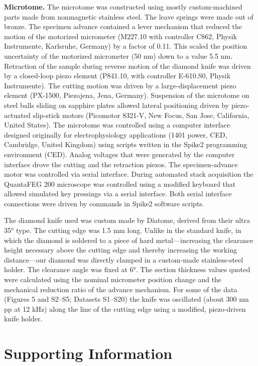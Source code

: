 \documentclass{article}
\begin{document}
\textbf{Microtome.} The microtome was constructed using mostly custom-machined parts made from nonmagnetic stainless steel. The leave springs were made out of bronze. The specimen advance contained a lever mechanism that reduced the motion of the motorized micrometer (M227.10 with controller C862, Physik Instrumente, Karlsruhe, Germany) by a factor of 0.11. This scaled the position uncertainty of the motorized micrometer (50 nm) down to a value 5.5 nm. Retraction of the sample during reverse motion of the diamond knife was driven by a closed-loop piezo element (P841.10, with controller E-610.S0, Physik Instrumente). The cutting motion was driven by a large-displacement piezo element (PX-1500, Piezojena, Jena, Germany). Suspension of the microtome on steel balls sliding on sapphire plates allowed lateral positioning driven by piezo-actuated slip-stick motors (Picomotor 8321-V, New Focus, San Jose, California, United States). The microtome was controlled using a computer interface designed originally for electrophysiology applications (1401 power, CED, Cambridge, United Kingdom) using scripts written in the Spike2 programming environment (CED). Analog voltages that were generated by the computer interface drove the cutting and the retraction piezos. The specimen-advance motor was controlled via serial interface. During automated stack acquisition the QuantaFEG 200 microscope was controlled using a modified keyboard that allowed simulated key pressings via a serial interface. Both serial interface connections were driven by commands in Spike2 software scripts.

The diamond knife used was custom made by Diatome, derived from their ultra 35° type. The cutting edge was 1.5 mm long. Unlike in the standard knife, in which the diamond is soldered to a piece of hard metal—increasing the clearance height necessary above the cutting edge and thereby increasing the working distance—our diamond was directly clamped in a custom-made stainless-steel holder. The clearance angle was fixed at 6°. The section thickness values quoted were calculated using the nominal micrometer position change and the mechanical reduction ratio of the advance mechanism. For some of the data (Figures 5 and S2–S5; Datasets S1–S20) the knife was oscillated (about 300 nm pp at 12 kHz) along the line of the cutting edge using a modified, piezo-driven knife holder.

\section*{Supporting Information}
\end{document}
